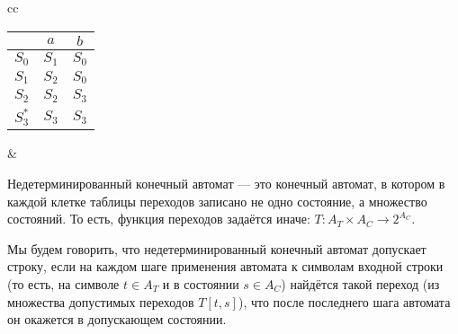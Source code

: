 \documentclass[12pt,a4paper,oneside]{article}
\begin{document}
\begin{tabular}{cc}

\begin{minipage}{5cm}
\begin{tabular}{c|cc}
& $a$ & $b$\\
\hline
$S_0$ & $S_1$ & $S_0$\\
$S_1$ & $S_2$ & $S_0$\\
$S_2$ & $S_2$ & $S_3$\\
$S_3^*$ & $S_3$ & $S_3$\\

\end{tabular}

\end{minipage}

&

\begin{minipage}{8cm}

\end{minipage}

\end{tabular}


\begin{definition}
Недетерминированный конечный автомат --- это конечный автомат, в котором в каждой клетке
таблицы переходов записано не одно состояние, а множество состояний. То есть, функция 
переходов задаётся иначе: $T: A_T\times A_C \rightarrow 2^{A_C}$.
\end{definition}

\begin{definition}
Мы будем говорить, что недетерминированный конечный автомат допускает строку, если
на каждом шаге применения автомата к символам входной строки (то есть, на символе
$t \in A_T$ и в состоянии $s \in A_C$) найдётся такой переход (из множества допустимых 
переходов $T[t,s]$), что после последнего шага автомата он окажется в допускающем
состоянии.
\end{definition}
\end{document}
